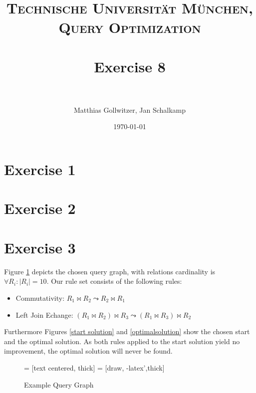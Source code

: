 \documentclass[paper=a4, fontsize=11pt]{scrartcl} %
\title{	
\normalfont \normalsize 
\textsc{Technische Universit\"at M\"unchen, Query Optimization} \\ [25pt] %
\horrule{0.5pt} \\[0.4cm] %
\huge Exercise 8 \\ %
\horrule{2pt} \\[0.5cm] %
}
\author{Matthias Gollwitzer, Jan Schalkamp} %
\date{\normalsize\today} %
\numberwithin{equation}{section} %
\numberwithin{figure}{section} %
\numberwithin{table}{section} %
\begin{document}
\lstset{language=SQL}
\maketitle %


\section{Exercise 1}

\section{Exercise 2}

\section{Exercise 3}
Figure \ref{qg} depicts the chosen query graph, with relations cardinality is $\forall R_i: |R_i|=10$. Our rule set consists of the following rules: 
\begin{itemize}
	\item Commutativity:	$R_1 \Join R_2 \leadsto R_2 \Join R_1$
	\item Left Join Echange: $(R_1\Join R_2) \Join R_3 \leadsto (R_1\Join R_3) \Join R_2$
\end{itemize}
Furthermore Figures \ref{start solution} and \ref{optimalsolution} show the chosen start and the optimal solution. As both rules applied to the start solution yield no improvement, the optimal solution will never be found.

\begin{figure}[H]
	\centering
		 = [text centered, thick]
		 = [draw, -latex',thick]  

	\caption{Example Query Graph}
	  \label{qg}
\end{figure}
\end{document}
